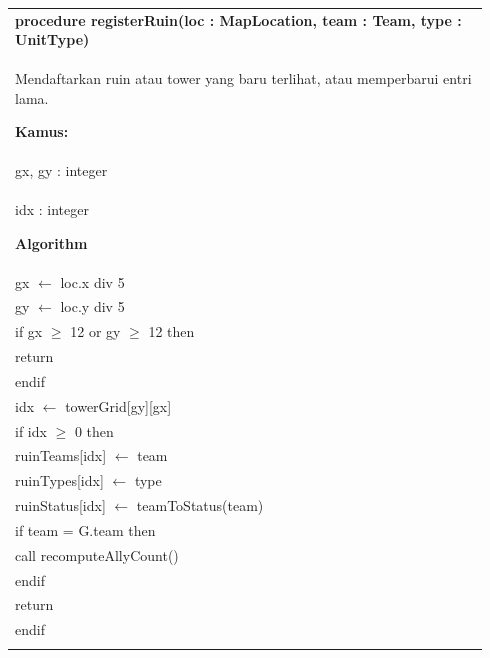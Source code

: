 \documentclass{article}
\newenvironment{pseudobox}
{
\centering
\begin{longtable}{|p{0.94\linewidth}|}
\hline
}
{
\\ \hline
\end{longtable}
\vspace{0.05cm}
}
\begin{document}
\begin{pseudobox}
\textbf{procedure registerRuin(loc : MapLocation, team : Team, type : UnitType)} \\
{ Mendaftarkan ruin atau tower yang baru terlihat, atau memperbarui entri lama. }

\textbf{Kamus:} \\
\hspace*{1em} gx, gy : integer \\
\hspace*{1em} idx : integer

\textbf{Algorithm} \\
\hspace*{1em} gx $\leftarrow$ loc.x div 5 \\
\hspace*{1em} gy $\leftarrow$ loc.y div 5 \\

\hspace*{1em} if gx $\geq$ 12 or gy $\geq$ 12 then \\
\hspace*{2em} return \\
\hspace*{1em} endif \\

\hspace*{1em} idx $\leftarrow$ towerGrid[gy][gx] \\

\hspace*{1em} if idx $\geq$ 0 then \\
\hspace*{2em} ruinTeams[idx] $\leftarrow$ team \\
\hspace*{2em} ruinTypes[idx] $\leftarrow$ type \\
\hspace*{2em} ruinStatus[idx] $\leftarrow$ teamToStatus(team) \\
\hspace*{2em} if team = G.team then \\
\hspace*{3em} call recomputeAllyCount() \\
\hspace*{2em} endif \\
\hspace*{2em} return \\
\hspace*{1em} endif \\


\end{pseudobox}
\end{document}
